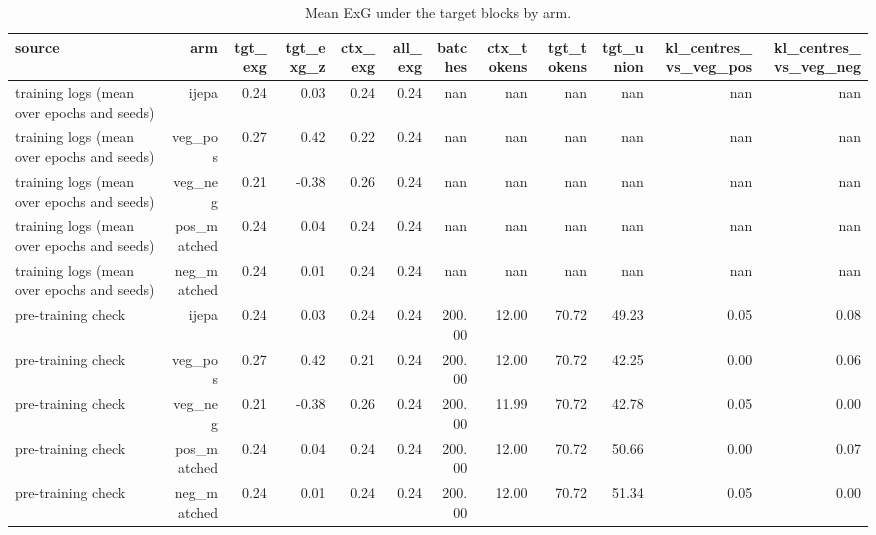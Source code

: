 \begin{table}[t]
\centering
\small
\caption{Mean ExG under the target blocks by arm.}
\label{tab:manipulation_check}
\begin{tabular}{lrrrrrrrrrrr}
\toprule
source & arm & tgt\_exg & tgt\_exg\_z & ctx\_exg & all\_exg & batches & ctx\_tokens & tgt\_tokens & tgt\_union & kl\_centres\_vs\_veg\_pos & kl\_centres\_vs\_veg\_neg \\
\midrule
training logs (mean over epochs and seeds) & ijepa & 0.24 & 0.03 & 0.24 & 0.24 & nan & nan & nan & nan & nan & nan \\
training logs (mean over epochs and seeds) & veg\_pos & 0.27 & 0.42 & 0.22 & 0.24 & nan & nan & nan & nan & nan & nan \\
training logs (mean over epochs and seeds) & veg\_neg & 0.21 & -0.38 & 0.26 & 0.24 & nan & nan & nan & nan & nan & nan \\
training logs (mean over epochs and seeds) & pos\_matched & 0.24 & 0.04 & 0.24 & 0.24 & nan & nan & nan & nan & nan & nan \\
training logs (mean over epochs and seeds) & neg\_matched & 0.24 & 0.01 & 0.24 & 0.24 & nan & nan & nan & nan & nan & nan \\
pre-training check & ijepa & 0.24 & 0.03 & 0.24 & 0.24 & 200.00 & 12.00 & 70.72 & 49.23 & 0.05 & 0.08 \\
pre-training check & veg\_pos & 0.27 & 0.42 & 0.21 & 0.24 & 200.00 & 12.00 & 70.72 & 42.25 & 0.00 & 0.06 \\
pre-training check & veg\_neg & 0.21 & -0.38 & 0.26 & 0.24 & 200.00 & 11.99 & 70.72 & 42.78 & 0.05 & 0.00 \\
pre-training check & pos\_matched & 0.24 & 0.04 & 0.24 & 0.24 & 200.00 & 12.00 & 70.72 & 50.66 & 0.00 & 0.07 \\
pre-training check & neg\_matched & 0.24 & 0.01 & 0.24 & 0.24 & 200.00 & 12.00 & 70.72 & 51.34 & 0.05 & 0.00 \\
\bottomrule
\end{tabular}
\end{table}
